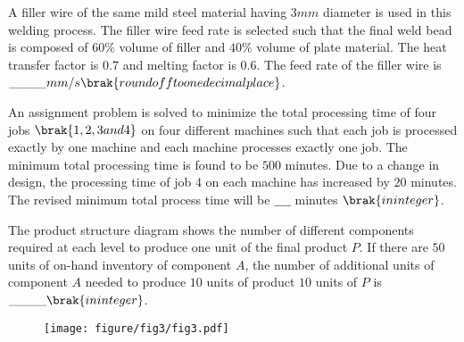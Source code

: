      A filler wire of the same mild steel material having $3 mm$ diameter is used in this welding process. The filler wire feed rate is selected such that the final weld bead is composed of $60\%$ volume of filler and $40\%$ volume of plate material. The heat transfer factor is $0.7$ and melting factor is $0.6$. The feed rate of the filler wire is $\_\_\_\_ mm/s \brak{round off to one decimal place}$.\\
     \item An assignment problem is solved to minimize the total processing time of four jobs $\brak{1,2,3 and 4}$ on four different machines such that each job is processed exactly by one machine and each machine processes exactly one job. The minimum total processing time is found to be $500$ minutes. Due to a change in design, the processing time of job $4$ on each machine has increased by $20$ minutes. The revised minimum total process time will be $\_\_\_\_$ minutes $\brak{in integer}$.\\
     \item The product structure diagram shows the number of different components required 
     at each level to produce one unit of the final product $P$. If there are $50$ units of on-hand inventory of component $A$, the number of additional units of component $A$ needed to produce $10$ units of product $10$ units of $P$ is $\_\_\_\_ \brak{in integer}$.\\
\begin{figure}[h!]
         \centering
        \texttt{[image: figure/fig3/fig3.pdf]}
		\caption{}
        \label{stemplot}

\end{figure}


